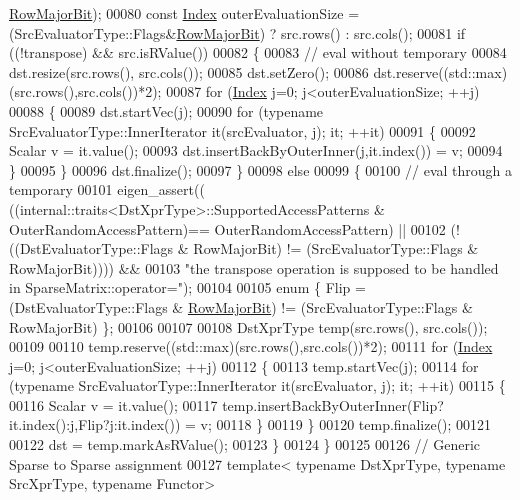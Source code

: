 \begin{DoxyCode}
      \hyperlink{group__flags_gae4f56c2a60bbe4bd2e44c5b19cbe8762}{RowMajorBit});
00080   \textcolor{keyword}{const} \hyperlink{namespace_eigen_a62e77e0933482dafde8fe197d9a2cfde}{Index} outerEvaluationSize = (SrcEvaluatorType::Flags&\hyperlink{group__flags_gae4f56c2a60bbe4bd2e44c5b19cbe8762}{RowMajorBit}) ? src.rows() : 
      src.cols();
00081   \textcolor{keywordflow}{if} ((!transpose) && src.isRValue())
00082   \{
00083     \textcolor{comment}{// eval without temporary}
00084     dst.resize(src.rows(), src.cols());
00085     dst.setZero();
00086     dst.reserve((std::max)(src.rows(),src.cols())*2);
00087     \textcolor{keywordflow}{for} (\hyperlink{namespace_eigen_a62e77e0933482dafde8fe197d9a2cfde}{Index} j=0; j<outerEvaluationSize; ++j)
00088     \{
00089       dst.startVec(j);
00090       \textcolor{keywordflow}{for} (\textcolor{keyword}{typename} SrcEvaluatorType::InnerIterator it(srcEvaluator, j); it; ++it)
00091       \{
00092         Scalar v = it.value();
00093         dst.insertBackByOuterInner(j,it.index()) = v;
00094       \}
00095     \}
00096     dst.finalize();
00097   \}
00098   \textcolor{keywordflow}{else}
00099   \{
00100     \textcolor{comment}{// eval through a temporary}
00101     eigen\_assert(( ((internal::traits<DstXprType>::SupportedAccessPatterns & OuterRandomAccessPattern)==
      OuterRandomAccessPattern) ||
00102               (!((DstEvaluatorType::Flags & RowMajorBit) != (SrcEvaluatorType::Flags & RowMajorBit)))) &&
00103               \textcolor{stringliteral}{"the transpose operation is supposed to be handled in SparseMatrix::operator="});
00104 
00105     \textcolor{keyword}{enum} \{ Flip = (DstEvaluatorType::Flags & \hyperlink{group__flags_gae4f56c2a60bbe4bd2e44c5b19cbe8762}{RowMajorBit}) != (SrcEvaluatorType::Flags & 
      RowMajorBit) \};
00106 
00107     
00108     DstXprType temp(src.rows(), src.cols());
00109 
00110     temp.reserve((std::max)(src.rows(),src.cols())*2);
00111     \textcolor{keywordflow}{for} (\hyperlink{namespace_eigen_a62e77e0933482dafde8fe197d9a2cfde}{Index} j=0; j<outerEvaluationSize; ++j)
00112     \{
00113       temp.startVec(j);
00114       \textcolor{keywordflow}{for} (\textcolor{keyword}{typename} SrcEvaluatorType::InnerIterator it(srcEvaluator, j); it; ++it)
00115       \{
00116         Scalar v = it.value();
00117         temp.insertBackByOuterInner(Flip?it.index():j,Flip?j:it.index()) = v;
00118       \}
00119     \}
00120     temp.finalize();
00121 
00122     dst = temp.markAsRValue();
00123   \}
00124 \}
00125 
00126 \textcolor{comment}{// Generic Sparse to Sparse assignment}
00127 \textcolor{keyword}{template}< \textcolor{keyword}{typename} DstXprType, \textcolor{keyword}{typename} SrcXprType, \textcolor{keyword}{typename} Functor>

\end{DoxyCode}

